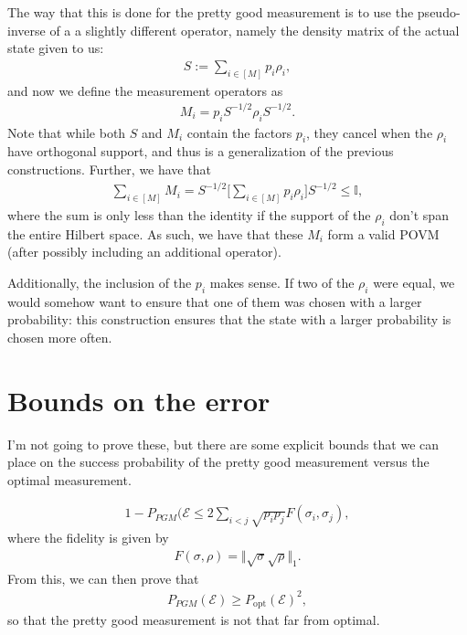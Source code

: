 \documentclass{amsart}
\theoremstyle{plain}
\theoremstyle{remark}
\newcommand{\II}{\mathbb{I}}
\begin{document}
The way that this is done for the pretty good measurement is to use the pseudo-inverse of a a slightly different operator, namely the density matrix of the actual state given to us:
\begin{align}
  S := \sum_{i\in [M]} p_i \rho_i,
\end{align}
and now we define the measurement operators as
\begin{align}
  M_i = p_i S^{-1/2} \rho_i S^{-1/2}.
\end{align}
Note that while both $S$ and $M_i$ contain the factors $p_i$, they cancel when the $\rho_i$ have orthogonal support, and thus is a generalization of the previous constructions.  Further, we have that
\begin{align}
  \sum_{i\in [M]} M_i = S^{-1/2} \bigg[ \sum_{i\in[M]} p_i \rho_i \bigg] S^{-1/2} \leq \II,
\end{align}
where the sum is only less than the identity if the support of the $\rho_i$ don't span the entire Hilbert space.  As such, we have that these $M_i$ form a valid POVM (after possibly including an additional operator).

Additionally, the inclusion of the $p_i$ makes sense.  If two of the $\rho_i$ were equal, we would somehow want to ensure that one of them was chosen with a larger probability: this construction ensures that the state with a larger probability is chosen more often.


\section{Bounds on the error}

I'm not going to prove these, but there are some explicit bounds that we can place on the success probability of the pretty good measurement versus the optimal measurement.  


\begin{align}
  1 - P_{PGM}(\mathcal{E}  \leq 2 \sum_{i < j} \sqrt{p_ip_j} F(\sigma_i,\sigma_j),
\end{align}
where the fidelity is given by 
\begin{align}
  F(\sigma,\rho) = \Vert \sqrt{\sigma} \sqrt{\rho}\Vert_1.
\end{align}
From this, we can then prove that
\begin{align}
  P_{PGM}(\mathcal{E}) \geq P_{\text{opt}}(\mathcal{E})^2,
\end{align}
so that the pretty good measurement is not that far from optimal.
\end{document}
